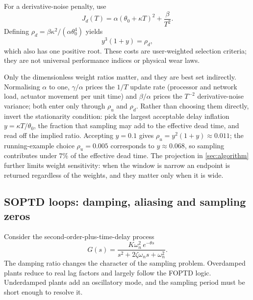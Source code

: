 \documentclass[a4paper,fleqn]{cas-sc}
\theoremstyle{remark}
\newcommand{\wn}{\omega_n}
\begin{document}
For a derivative-noise penalty, use
\begin{equation}
J_d(T)=\alpha(\theta_0+\kappa T)^2+\frac{\beta}{T^2}.
\label{eq:soptdcost}
\end{equation}
Defining $\rho_d=\beta\kappa^2/(\alpha\theta_0^4)$ yields
\begin{equation}
y^3(1+y)=\rho_d,
\label{eq:root-d}
\end{equation}
which also has one positive root. These costs are user-weighted selection criteria; they are not universal performance indices or physical wear laws.

Only the dimensionless weight ratios matter, and they are best set indirectly. Normalising $\alpha$ to one, $\gamma/\alpha$ prices the $1/T$ update rate (processor and network load, actuator movement per unit time) and $\beta/\alpha$ prices the $T^{-2}$ derivative-noise variance; both enter only through $\rho_u$ and $\rho_d$. Rather than choosing them directly, invert the stationarity condition: pick the largest acceptable delay inflation $y=\kappa T/\theta_0$, the fraction that sampling may add to the effective dead time, and read off the implied ratio. Accepting $y=0.1$ gives $\rho_u=y^2(1+y)\approx0.011$; the running-example choice $\rho_u=0.005$ corresponds to $y\approx0.068$, so sampling contributes under $7\%$ of the effective dead time. The projection in \cref{sec:algorithm} further limits weight sensitivity: when the window is narrow an endpoint is returned regardless of the weights, and they matter only when it is wide.

\subsection{SOPTD loops: damping, aliasing and sampling zeros}
\label{sec:soptd}
Consider the second-order-plus-time-delay process
\begin{equation}
G(s)=\frac{K\wn^2\,e^{-\theta s}}{s^2+2\zeta\wn s+\wn^2}.
\label{eq:soptd}
\end{equation}
The damping ratio changes the character of the sampling problem. Overdamped
plants reduce to real lag factors and largely follow the FOPTD logic.
Underdamped plants add an oscillatory mode, and the sampling period must be
short enough to resolve it.
\end{document}
